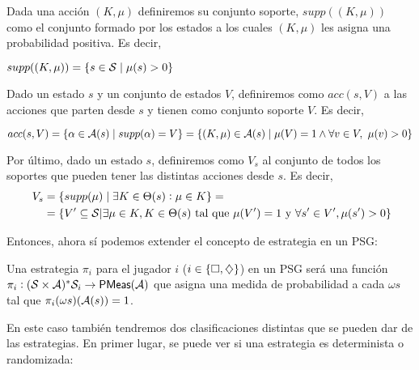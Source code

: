 \begin{definition}
	Dada una acción $(K, \mu)$ definiremos su conjunto soporte, $supp((K, \mu))$ como el conjunto formado por los estados a los cuales $(K, \mu)$ les asigna una probabilidad positiva. Es decir,
	\vspace{-1.5cm}
	\begin{center}
		$supp((K, \mu)) = \{s \in \mathcal{S} \mid \mu(s) > 0\}$
	\end{center}
	\vspace{-1.5cm}
	Dado un estado $s$ y un conjunto de estados $V$, definiremos como $acc(s, V)$ a
	las acciones que parten desde $s$ y tienen como conjunto soporte $V$. Es decir,
	\vspace{-1.5cm}
	\begin{center}
		$acc(s, V) = \{\alpha \in \mathcal{A}(s) \mid supp(\alpha) = V\} = \{(K, \mu) \in \mathcal{A}(s) \mid \mu(V) = 1 \wedge \forall v \in V, \ \mu(v) > 0\}$
	\end{center}
	\vspace{-1.5cm}
	Por último, dado un estado $s$, definiremos como $V_s$ al conjunto de todos los
	soportes que pueden tener las distintas acciones desde $s$. Es decir,
	\vspace{-1.5cm}
	\begin{align*}~\label{definicionVs}
		V_s &= \{supp(\mu) \mid \exists K \in \Theta(s): \mu \in K\} = \\
		&= \{V' \subseteq \mathcal{S} | \exists \mu \in K, K \in \Theta(s) \text{ tal que } \mu(V') = 1 \text{ y } \forall s' \in V', \mu(s') > 0\}
	\end{align*}
	\vspace{-1.5cm}
\end{definition}

Entonces, ahora sí podemos extender el concepto de estrategia en un PSG:

\begin{definition}
	Una estrategia $\pi_i$ para el jugador $i$ ($i \in \{\square, \diamondsuit\}$) en un PSG será una función $\pi_i : (\mathcal{S} \times \mathcal{A})^* \mathcal{S}_i \rightarrow \textsf{PMeas}(\mathcal{A})$ que asigna una medida de probabilidad a cada $\omega s$ tal que $\pi_i(\omega s)(\mathcal{A}(s)) = 1$.
\end{definition}

En este caso también tendremos dos clasificaciones distintas que se pueden dar
de las estrategias. En primer lugar, se puede ver si una estrategia es
determinista o randomizada:


